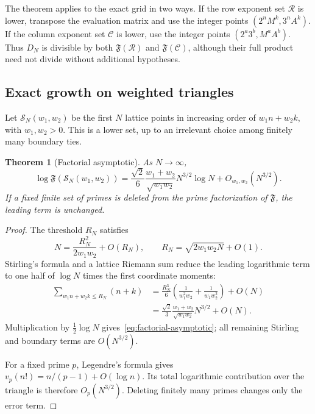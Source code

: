 \documentclass[11pt]{article}
\newcommand{\1}{\mathbf 1}
\theoremstyle{plain}
\newtheorem{theorem}{Theorem}[section]
\theoremstyle{definition}
\theoremstyle{remark}
\begin{document}
The theorem applies to the exact grid in two ways.  If the row exponent set
$\mathcal R$ is lower, transpose the evaluation matrix and use the integer
points $(2^nM^k,3^nA^k)$.  If the column exponent set $\mathcal C$ is lower,
use the integer points $(2^a3^b,M^aA^b)$.  Thus $D_N$ is divisible by both
$\mathfrak F(\mathcal R)$ and $\mathfrak F(\mathcal C)$, although their full
product need not divide without additional hypotheses.

\subsection{Exact growth on weighted triangles}

Let $\mathcal S_N(w_1,w_2)$ be the first $N$ lattice points in increasing
order of $w_1n+w_2k$, with $w_1,w_2>0$.  This is a lower set, up to an
irrelevant choice among finitely many boundary ties.

\begin{theorem}[Factorial asymptotic]\label{thm:factorial-asymptotic}
As $N\to\infty$,
\begin{equation}\label{eq:factorial-asymptotic}
 \log\mathfrak F(\mathcal S_N(w_1,w_2))
 =\frac{\sqrt2}{6}\frac{w_1+w_2}{\sqrt{w_1w_2}}
 N^{3/2}\log N+O_{w_1,w_2}(N^{3/2}).
\end{equation}
If a fixed finite set of primes is deleted from the prime factorization of
$\mathfrak F$, the leading term is unchanged.
\end{theorem}

\begin{proof}
The threshold $R_N$ satisfies
\[
 N=\frac{R_N^2}{2w_1w_2}+O(R_N),
 \qquad
 R_N=\sqrt{2w_1w_2N}+O(1).
\]
Stirling's formula and a lattice Riemann sum reduce the leading logarithmic
term to one half of $\log N$ times the first coordinate moments:
\begin{align*}
 \sum_{w_1n+w_2k\le R_N}(n+k)
 &=\frac{R_N^3}{6}
 \left(\frac1{w_1^2w_2}+\frac1{w_1w_2^2}\right)+O(N)\\
 &=\frac{\sqrt2}{3}\frac{w_1+w_2}{\sqrt{w_1w_2}}N^{3/2}+O(N).
\end{align*}
Multiplication by $\frac12\log N$ gives~\eqref{eq:factorial-asymptotic}; all
remaining Stirling and boundary terms are $O(N^{3/2})$.

For a fixed prime $p$, Legendre's formula gives
$v_p(n!)=n/(p-1)+O(\log n)$.  Its total logarithmic contribution over the
triangle is therefore $O_p(N^{3/2})$.  Deleting finitely many primes changes
only the error term.
\end{proof}
\end{document}
